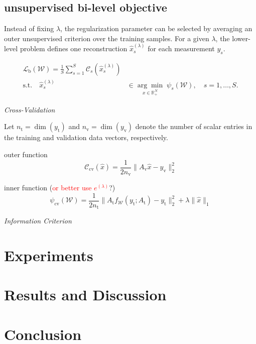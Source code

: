 \documentclass[peer-review]{fa2026}
\begin{document}
\subsection{unsupervised bi-level objective}

Instead of fixing $\lambda$, the regularization parameter can be selected by
averaging an outer unsupervised criterion over the training samples. For a
given $\lambda$, the lower-level problem defines one reconstruction
$\hat{x}_s^{(\lambda)}$ for each measurement $y_s$.

\begin{equation}
\begin{aligned}
\mathcal{L}_{\mathrm{b}}(\mathcal{W}) = \frac{1}{S}\sum_{s=1}^{S}
\mathcal{C}_s\!\left(\hat{x}_s^{(\lambda)}\right) \\
\text{s.t.}\quad
\hat{x}_s^{(\lambda)} &\in
\underset{x \in \mathbb{R}_+^N}{\arg\min}\; \psi_s(\mathcal{W}),
\quad s=1,\dots,S .
\end{aligned}
\end{equation}

\textit{Cross-Validation}

Let $n_{\text{t}} = \dim(y_{\text{t}})$ and
$n_{\text{v}} = \dim(y_{\text{v}})$ denote the number of scalar entries in
the training and validation data vectors, respectively.

outer function
\begin{equation}
    \mathcal{C}_{\text{cv}}(\hat{x}) =
    \frac{1}{2n_{\text{v}}}\|A_{\text{v}} \hat{x} - y_{\text{v}}\|_2^2
\end{equation}

inner function (\textcolor{red}{or better use $e^{(\lambda)}$}?)
\begin{equation}
    \psi_{\text{cv}}(\mathcal{W}) =
    \frac{1}{2n_{\text{t}}}\|A_{\text{t}} f_{\mathcal W}(y_{\text{t}};A_{\text{t}}) - y_{\text{t}}\|_2^2
    + \lambda \|\hat{x}\|_1
\end{equation}

\textit{Information Criterion}



\section{Experiments}\label{sec:setup}

\section{Results and Discussion}\label{sec:results}

\section{Conclusion}\label{sec:conclusion}


\printbibliography
\end{document}

